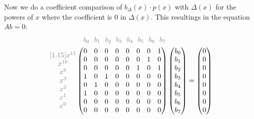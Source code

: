 \documentclass[10pt]{article}
\begin{document}
Now we do a coefficient comparison of $b_\Delta(x)\cdot p(x)$ with $\Delta(x)$ for the powers of $x$ where the coefficient is $0$ in $\Delta(x)$. This resultings in the equation $Ab=0$:
\begin{equation}
	\begin{aligned}
		 & \ \ \ \color{gray}\begin{matrix}
			                     b_0 & \!\! b_1 & \!\! b_2 & \!\! b_3 & \!\! b_4 & \!\! b_5 & \!\! b_6 & \!\! b_7
		                     \end{matrix} \\
		\color{gray}\begin{matrix}[1.15]
			            x^{11} \\ x^{10} \\ x^9 \\ x^3 \\ x^2 \\ x^1 \\ x^0
		            \end{matrix}
		 & \begin{pmatrix}
			   0 & 0 & 0 & 0 & 0 & 0 & 0 & 1 \\
			   0 & 0 & 0 & 0 & 0 & 0 & 1 & 0 \\
			   0 & 0 & 0 & 0 & 0 & 1 & 0 & 1 \\
			   1 & 0 & 1 & 0 & 0 & 0 & 0 & 0 \\
			   0 & 1 & 0 & 0 & 0 & 0 & 0 & 0 \\
			   1 & 0 & 0 & 0 & 0 & 0 & 0 & 0 \\
			   0 & 0 & 0 & 0 & 0 & 0 & 0 & 0 \\
			   0 & 0 & 0 & 0 & 0 & 0 & 0 & 0
		   \end{pmatrix}
		\begin{pmatrix}
			b_0 \\ b_1 \\ b_2 \\ b_3 \\ b_4 \\ b_5 \\ b_6 \\ b_7
		\end{pmatrix} =
		\begin{pmatrix}
			0 \\ 0 \\ 0 \\ 0 \\ 0 \\ 0 \\ 0 \\ 0
		\end{pmatrix}
	\end{aligned}
\end{equation}
\end{document}
